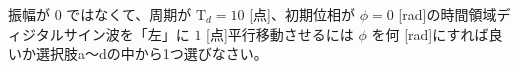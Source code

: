 振幅が $0$ ではなくて、周期が $\textrm{T}_d = 10$ [点]、初期位相が $\phi = 0$ [rad]の時間領域ディジタルサイン波を「左」に $1$ [点]平行移動させるには $\phi$ を何 [rad]にすれば良いか選択肢a〜dの中から1つ選びなさい。
